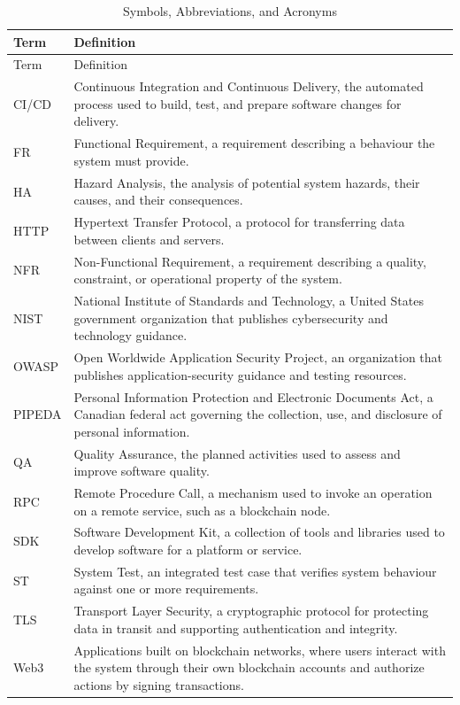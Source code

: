 \documentclass[12pt]{article}
\begin{document}
\renewcommand{\arraystretch}{1.2}
\begin{longtable}{p{} p{}}
\caption{Symbols, Abbreviations, and Acronyms}\\
\toprule
Term & Definition\\
\midrule
\endfirsthead
\toprule
Term & Definition\\
\midrule
\endhead
CI/CD & Continuous Integration and Continuous Delivery, the automated process used to build, test, and prepare software changes for delivery.\\
FR & Functional Requirement, a requirement describing a behaviour the system must provide.\\
HA & Hazard Analysis, the analysis of potential system hazards, their causes, and their consequences.\\
HTTP & Hypertext Transfer Protocol, a protocol for transferring data between clients and servers.\\
NFR & Non-Functional Requirement, a requirement describing a quality, constraint, or operational property of the system.\\
NIST & National Institute of Standards and Technology, a United States government organization that publishes cybersecurity and technology guidance.\\
OWASP & Open Worldwide Application Security Project, an organization that publishes application-security guidance and testing resources.\\
PIPEDA & Personal Information Protection and Electronic Documents Act, a Canadian federal act governing the collection, use, and disclosure of personal information.\\
QA & Quality Assurance, the planned activities used to assess and improve software quality.\\
RPC & Remote Procedure Call, a mechanism used to invoke an operation on a remote service, such as a blockchain node.\\
SDK & Software Development Kit, a collection of tools and libraries used to develop software for a platform or service.\\
ST & System Test, an integrated test case that verifies system behaviour against one or more requirements.\\
TLS & Transport Layer Security, a cryptographic protocol for protecting data in transit and supporting authentication and integrity.\\
Web3 & Applications built on blockchain networks, where users interact with the system through their own blockchain accounts and authorize actions by signing transactions.\\
\bottomrule
\end{longtable}
\end{document}
